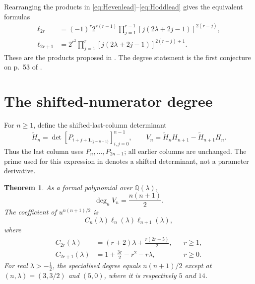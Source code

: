 \documentclass[11pt]{article}
\numberwithin{equation}{section}
\newtheorem{theorem}{Theorem}[section]
\theoremstyle{remark}
\newcommand{\Q}{\mathbb{Q}}
\newcommand{\wt}{\widetilde}
\begin{document}
Rearranging the products in \eqref{eq:Hevenlead}--\eqref{eq:Hoddlead}
gives the equivalent formulas
\begin{align}
 \ell_{2r}&=(-1)^r2^{r(r-1)}
   \prod_{j=1}^{r-1}[j(2\lambda+2j-1)]^{2(r-j)},\label{eq:LYeven}\\
 \ell_{2r+1}&=2^{r^2}
   \prod_{j=1}^{r}[j(2\lambda+2j-1)]^{2(r-j)+1}.\label{eq:LYodd}
\end{align}
These are the products proposed in \cite[Remark~2.6]{LyuZhou2026}.
The degree statement is the first conjecture on p.~53 of
\cite{MCM2008}.

\section{The shifted-numerator degree}\label{sec:numerator}

For $n\ge1$, define the shifted-last-column determinant
\begin{equation}\label{eq:Htilde}
 \wt H_n=\det[P_{i+j+\mathbf{1}_{\{j=n-1\}}}]_{i,j=0}^{n-1},
 \qquad
 V_n=\wt H_nH_{n+1}-\wt H_{n+1}H_n.
\end{equation}
Thus the last column uses $P_n,\ldots,P_{2n-1}$; all earlier columns
are unchanged. The prime used for this expression in \cite{MCM2008}
denotes a shifted determinant, not a parameter derivative.

\begin{theorem}\label{thm:Vdegree}
As a formal polynomial over $\Q(\lambda)$,
\begin{equation}\label{eq:Vdegree}
                            \deg_u V_n=\frac{n(n+1)}2.
\end{equation}
The coefficient of $u^{n(n+1)/2}$ is
\begin{equation}\label{eq:Vlead}
                       C_n(\lambda)\ell_n(\lambda)\ell_{n+1}(\lambda),
\end{equation}
where
\begin{align}
 C_{2r}(\lambda)&=(r+2)\lambda+\frac{r(2r+5)}2,
                      &&r\ge1,\label{eq:Ceven}\\
 C_{2r+1}(\lambda)&=1+\frac{3r}{2}-r^2-r\lambda,
                      &&r\ge0.\label{eq:Codd}
\end{align}
For real $\lambda>-\tfrac12$, the specialised degree equals
$n(n+1)/2$ except at $(n,\lambda)=(3,3/2)$ and $(5,0)$, where it is
respectively $5$ and $14$.
\end{theorem}
\end{document}
